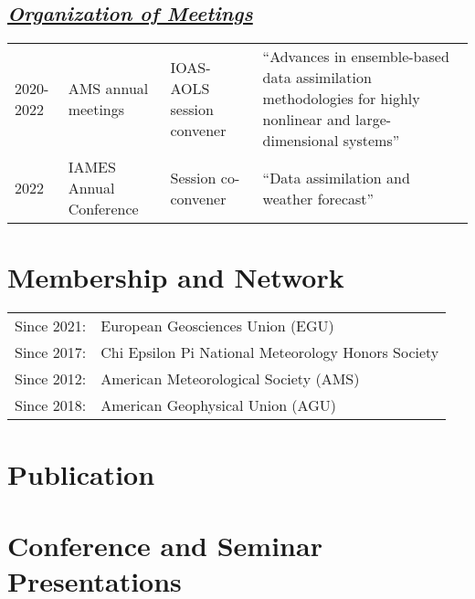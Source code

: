 \documentclass{article}
\newcommand{\cvsection}[1]{\section*{\bfseries#1}}
\newcommand{\cvsubsection}[1]{\subsection*{\itshape\uline{#1}}}
\begin{document}
\cvsubsection{Organization of Meetings}
\begin{tabular}{l p{4cm} p{3cm} p{6cm}}
    2020-2022 & AMS annual meetings & IOAS-AOLS session convener & ``Advances in ensemble-based data assimilation methodologies for highly nonlinear and large-dimensional systems'' \\
    2022 & IAMES Annual Conference & Session co-convener & ``Data assimilation and weather forecast'' \\
\end{tabular}

\cvsection{Membership and Network}
\begin{tabular}{l l}
    Since 2021: & European Geosciences Union (EGU) \\
    Since 2017: & Chi Epsilon Pi National Meteorology Honors Society \\
    Since 2012: & American Meteorological Society (AMS) \\
    Since 2018: & American Geophysical Union (AGU) \\
\end{tabular}


\cvsection{Publication}


\cvsection{Conference and Seminar Presentations}

\end{document}
